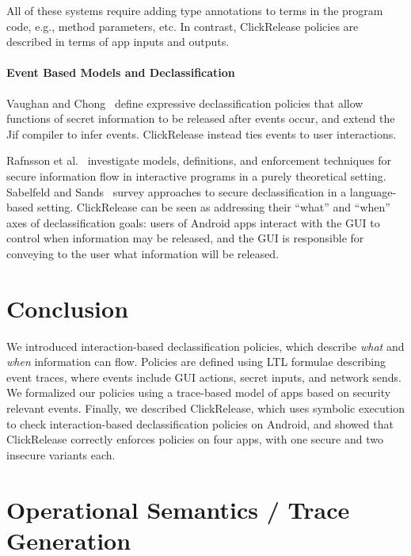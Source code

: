 \documentclass{llncs}
\newcommand{\toolname}{ClickRelease\xspace}
\begin{document}
All of these systems require adding type annotations to terms in the
program code, e.g., method parameters, etc. In contrast, \toolname{}
policies are described in terms of app inputs and
outputs.

\paragraph*{Event Based Models and Declassification}

Vaughan and Chong~\cite{Vaughan:2011} define expressive declassification policies that
allow functions of secret information to be released after events occur, and
extend the Jif compiler to infer events.  \toolname instead 
ties events to user interactions.

Rafnsson et al.~\cite{Rafnsson:12} investigate models, definitions, and enforcement
techniques for secure information flow in interactive programs in a
purely theoretical setting.
Sabelfeld and Sands~\cite{Sabelfeld:2009} survey approaches to
secure declassification in a language-based setting.  \toolname
can be seen as addressing their ``what'' and ``when'' axes of
declassification goals:  users of Android apps interact with the GUI
to control when information may be released, and the GUI is responsible
for conveying to the user what information will be released.

\section{Conclusion}
\label{sec:conclusion}

We introduced interaction-based declassification policies, which describe
\emph{what} and \emph{when} information can flow. Policies are defined
using LTL formulae describing event traces, where events include GUI
actions, secret inputs, and network sends. We formalized our policies
using a trace-based model of apps based on security relevant events.
Finally, we described \toolname{}, which uses symbolic
execution to check interaction-based declassification policies on Android, and
showed that \toolname{} correctly enforces policies on four apps,
with one secure and two insecure variants each.




\appendix 

\section{Operational Semantics / Trace Generation}
\label{sec:semantics}
\end{document}
